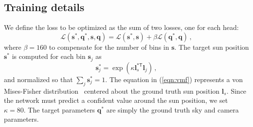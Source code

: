 \subsection{Training details}

We define the loss to be optimized as the sum of two losses, one for each head: 
%
\begin{equation}
\mathcal{L}(\mathbf{s}^*, \mathbf{q}^*, \mathbf{s}, \mathbf{q}) = \mathcal{L}(\mathbf{s}^*, \mathbf{s}) + \beta \mathcal{L}(\mathbf{q}^*, \mathbf{q}) \,,
\label{eqn:ch3_loss}
\end{equation}
%
where $\beta = 160$ to compensate for the number of bins in $\mathbf{s}$. The target sun position $\mathbf{s}^*$ is computed for each bin $\mathbf{s}_j$ as 
%
\begin{equation}
\mathbf{s}^*_j = \exp(\kappa \mathbf{l}_s^{*\mathsf{T}} \mathbf{l}_j) \,,
\label{eqn:vmf}
\end{equation}
%
and normalized so that $\sum_j \mathbf{s}^*_j = 1$. The equation in (\ref{eqn:vmf}) represents a von Mises-Fisher distribution~\cite{banerjee-jmlr-05} centered about the ground truth sun position $\mathbf{l}_s$. Since the network must predict a confident value around the sun position, we set $\kappa = 80$. The target parameters $\mathbf{q}^*$ are simply the ground truth sky and camera parameters. 

